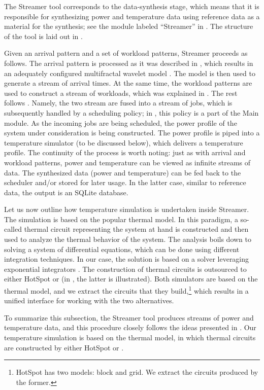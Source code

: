 
The Streamer tool corresponds to the data-synthesis stage, which means that it
is responsible for synthesizing power and temperature data using reference data
as a material for the synthesis; see the module labeled ``Streamer'' in
. The structure of the tool is laid out in .

Given an arrival pattern and a set of workload patterns, Streamer proceeds as
follows. The arrival pattern is processed as it was described in ,
which results in an adequately configured multifractal wavelet model
\cite{riedi1999}. The model is then used to generate a stream of arrival times.
At the same time, the workload patterns are used to construct a stream of
workloads, which was explained in . The rest follows
. Namely, the two stream are fused into a stream of jobs,
which is subsequently handled by a scheduling policy; in , this
policy is a part of the Main module. As the incoming jobs are being scheduled,
the power profile of the system under consideration is being constructed. The
power profile is piped into a temperature simulator (to be discussed below),
which delivers a temperature profile. The continuity of the process is worth
noting: just as with arrival and workload patterns, power and temperature can be
viewed as infinite streams of data. The synthesized data (power and temperature)
can be fed back to the scheduler and/or stored for later usage. In the latter
case, similar to reference data, the output is an SQLite database.

Let us now outline how temperature simulation is undertaken inside Streamer. The
simulation is based on the popular thermal  model. In this paradigm, a
so-called thermal  circuit representing the system at hand is constructed
and then used to analyze the thermal behavior of the system. The analysis boils
down to solving a system of differential equations, which can be done using
different integration techniques. In our case, the solution is based on a solver
leveraging exponential integrators \cite{hochbruck2010, ukhov2012}. The
construction of thermal circuits is outsourced to either HotSpot
\cite{skadron2004} or  \cite{sridhar2010} (in , the
latter is illustrated). Both simulators are based on the thermal  model,
and we extract the circuits that they build,\footnote{HotSpot has two models:
block and grid. We extract the circuits produced by the former.} which results
in a unified interface for working with the two alternatives.

To summarize this subsection, the Streamer tool produces streams of power and
temperature data, and this procedure closely follows the ideas presented in
. Our temperature simulation is based on the thermal 
model, in which thermal circuits are constructed by either HotSpot or
.
